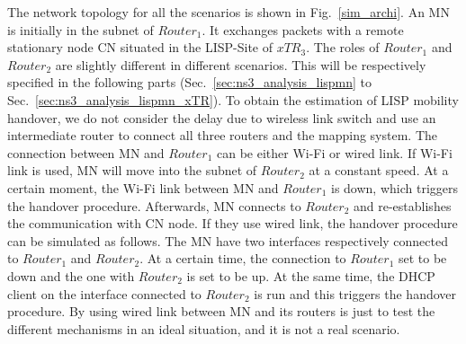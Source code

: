 
The network topology for all the scenarios is shown in Fig.~\ref{sim_archi}. An MN is initially in the subnet of $Router_1$. It exchanges packets with a remote stationary node CN situated in the LISP-Site of $xTR_3$. The roles of $Router_1$ and $Router_2$ are slightly different in different scenarios. This will be respectively specified in the following parts (Sec.~\ref{sec:ns3_analysis_lispmn} to Sec.~\ref{sec:ns3_analysis_lispmn_xTR}). To obtain the estimation of LISP mobility handover, we do not consider the delay due to wireless link switch and use an intermediate router to connect all three routers and the mapping system. The connection between MN and $Router_1$ can be either Wi-Fi or wired link. If Wi-Fi link is used, MN will move into the subnet of $Router_2$ at a constant speed. At a certain moment, the Wi-Fi link between MN and $Router_1$ is down, which triggers the handover procedure. Afterwards, MN connects to $Router_2$ and re-establishes the communication with CN node. If they use wired link, the handover procedure can be simulated as follows. The MN have two interfaces respectively connected to $Router_1$ and $Router_2$. At a certain time, the connection to $Router_1$ set to be down and the one with $Router_2$ is set to be up. At the same time, the DHCP client on the interface connected to $Router_2$ is run and this triggers the handover procedure. By using wired link between MN and its routers is just to test the different mechanisms in an ideal situation, and it is not a real scenario.

